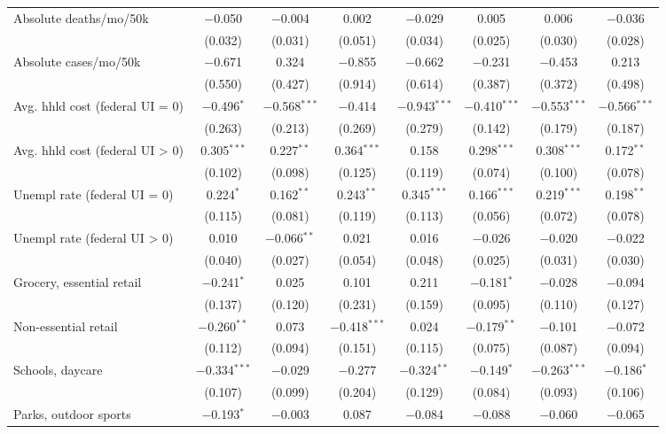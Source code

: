 \begin{table}[!htbp]
\begin{tabular}{@{\extracolsep{5pt}}lccccccc}
 Absolute deaths/mo/50k & $-$0.050 & $-$0.004 & 0.002 & $-$0.029 & 0.005 & 0.006 & $-$0.036 \\ 
  & (0.032) & (0.031) & (0.051) & (0.034) & (0.025) & (0.030) & (0.028) \\ 
  Absolute cases/mo/50k & $-$0.671 & 0.324 & $-$0.855 & $-$0.662 & $-$0.231 & $-$0.453 & 0.213 \\ 
  & (0.550) & (0.427) & (0.914) & (0.614) & (0.387) & (0.372) & (0.498) \\ 
  Avg. hhld cost (federal UI = 0) & $-$0.496$^{*}$ & $-$0.568$^{***}$ & $-$0.414 & $-$0.943$^{***}$ & $-$0.410$^{***}$ & $-$0.553$^{***}$ & $-$0.566$^{***}$ \\ 
  & (0.263) & (0.213) & (0.269) & (0.279) & (0.142) & (0.179) & (0.187) \\ 
  Avg. hhld cost (federal UI > 0) & 0.305$^{***}$ & 0.227$^{**}$ & 0.364$^{***}$ & 0.158 & 0.298$^{***}$ & 0.308$^{***}$ & 0.172$^{**}$ \\ 
  & (0.102) & (0.098) & (0.125) & (0.119) & (0.074) & (0.100) & (0.078) \\ 
  Unempl rate (federal UI = 0) & 0.224$^{*}$ & 0.162$^{**}$ & 0.243$^{**}$ & 0.345$^{***}$ & 0.166$^{***}$ & 0.219$^{***}$ & 0.198$^{**}$ \\ 
  & (0.115) & (0.081) & (0.119) & (0.113) & (0.056) & (0.072) & (0.078) \\ 
  Unempl rate (federal UI > 0) & 0.010 & $-$0.066$^{**}$ & 0.021 & 0.016 & $-$0.026 & $-$0.020 & $-$0.022 \\ 
  & (0.040) & (0.027) & (0.054) & (0.048) & (0.025) & (0.031) & (0.030) \\ 
  Grocery, essential retail & $-$0.241$^{*}$ & 0.025 & 0.101 & 0.211 & $-$0.181$^{*}$ & $-$0.028 & $-$0.094 \\ 
  & (0.137) & (0.120) & (0.231) & (0.159) & (0.095) & (0.110) & (0.127) \\ 
  Non-essential retail & $-$0.260$^{**}$ & 0.073 & $-$0.418$^{***}$ & 0.024 & $-$0.179$^{**}$ & $-$0.101 & $-$0.072 \\ 
  & (0.112) & (0.094) & (0.151) & (0.115) & (0.075) & (0.087) & (0.094) \\ 
  Schools, daycare & $-$0.334$^{***}$ & $-$0.029 & $-$0.277 & $-$0.324$^{**}$ & $-$0.149$^{*}$ & $-$0.263$^{***}$ & $-$0.186$^{*}$ \\ 
  & (0.107) & (0.099) & (0.204) & (0.129) & (0.084) & (0.093) & (0.106) \\ 
  Parks, outdoor sports & $-$0.193$^{*}$ & $-$0.003 & 0.087 & $-$0.084 & $-$0.088 & $-$0.060 & $-$0.065 \\ 

\end{tabular}
\end{table}
